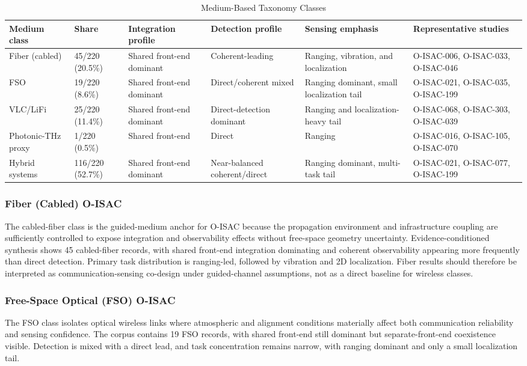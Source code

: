 \begin{table}[!t]
\caption{Medium-Based Taxonomy Classes}
\label{tab:medium-classes}
\centering
\footnotesize
\setlength{\tabcolsep}{4pt}
\begin{tabularx}{\textwidth}{p{}p{}p{}p{}p{}X}
\toprule
\textbf{Medium class} & \textbf{Share} & \textbf{Integration profile} & \textbf{Detection profile} & \textbf{Sensing emphasis} & \textbf{Representative studies} \\
\midrule
Fiber (cabled) & 45/220 (20.5\%) & Shared front-end dominant & Coherent-leading & Ranging, vibration, and localization & O-ISAC-006, O-ISAC-033, O-ISAC-046 \\
FSO & 19/220 (8.6\%) & Shared front-end dominant & Direct/coherent mixed & Ranging dominant, small localization tail & O-ISAC-021, O-ISAC-035, O-ISAC-199 \\
VLC/LiFi & 25/220 (11.4\%) & Shared front-end dominant & Direct-detection dominant & Ranging and localization-heavy tail & O-ISAC-068, O-ISAC-303, O-ISAC-039 \\
Photonic-THz proxy & 1/220 (0.5\%) & Shared front-end & Direct & Ranging & O-ISAC-016, O-ISAC-105, O-ISAC-070 \\
Hybrid systems & 116/220 (52.7\%) & Shared front-end dominant & Near-balanced coherent/direct & Ranging dominant, multi-task tail & O-ISAC-021, O-ISAC-077, O-ISAC-199 \\
\bottomrule
\end{tabularx}
\end{table}

\subsubsection{Fiber (Cabled) O-ISAC}
The cabled-fiber class is the guided-medium anchor for O-ISAC because the propagation environment and infrastructure coupling are sufficiently controlled to expose integration and observability effects without free-space geometry uncertainty. Evidence-conditioned synthesis shows 45 cabled-fiber records, with shared front-end integration dominating and coherent observability appearing more frequently than direct detection. Primary task distribution is ranging-led, followed by vibration and 2D localization. Fiber results should therefore be interpreted as communication-sensing co-design under guided-channel assumptions, not as a direct baseline for wireless classes.

\subsubsection{Free-Space Optical (FSO) O-ISAC}
The FSO class isolates optical wireless links where atmospheric and alignment conditions materially affect both communication reliability and sensing confidence. The corpus contains 19 FSO records, with shared front-end still dominant but separate-front-end coexistence visible. Detection is mixed with a direct lead, and task concentration remains narrow, with ranging dominant and only a small localization tail.

